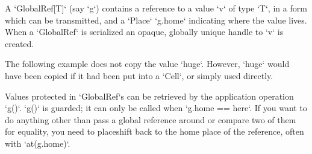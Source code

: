 A \xcd`GlobalRef[T]` (say \xcd`g`) contains a reference to
a value \xcd`v` of type \xcd`T`, in a form which can be transmitted, and a \xcd`Place`
\xcd`g.home` indicating where the value lives. When a 
\xcd`GlobalRef` is serialized an opaque, globally unique handle to
\xcd`v` is created.  

\begin{ex}The following example does not copy the value \xcd`huge`.  However, \xcd`huge`
would have been copied if it had been put into a \xcd`Cell`, or simply used
directly. 


% 
\begin{xten}
val huge = "A potentially big thing";
val href = GlobalRef(huge);
at (here) {
   use(href);
  }
}
\end{xten}


\end{ex}

Values protected in \xcd`GlobalRef`s can be retrieved by the application
operation \xcd`g()`.  \xcd`g()` is guarded; it can 
only be called when \xcd`g.home == here`.  If you  want to do anything other
than pass a global reference around or compare two of them for equality, you
need to placeshift back to the home place of the reference, often with
\xcd`at(g.home)`.   

